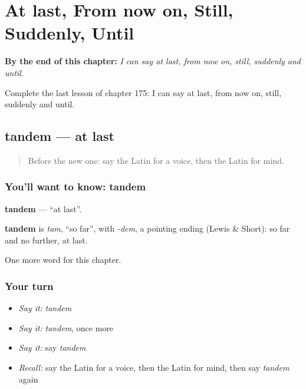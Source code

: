 
\chapter{At last, From now on, Still, Suddenly, Until}
\label{ch:la-at-last-from-now-on-still-suddenly-until}

\begin{chapteropening}
\textbf{By the end of this chapter:} \emph{I can say at last, from now on, still, suddenly and until.}

Complete the last lesson of chapter 175: I can say at last, from now on, still, suddenly and until.
\end{chapteropening}

\section[tandem]{tandem — at last}

\label{lesson:LA-C175-tandem}



\begin{quote}
Before the new one: say the Latin for a voice, then the Latin for mind.
\end{quote}

\subsection*{You'll want to know: tandem}
\textbf{tandem} — \textquotedblleft{}at last\textquotedblright{}.

\begin{cousinweb}
\textbf{tandem} is \emph{tam}, \textquotedblleft{}so far\textquotedblright{}, with \emph{-dem}, a pointing ending (Lewis \& Short): so far and no further, at last.
\end{cousinweb}

\begin{grammarlens}[title={What you've built}]
One more word for this chapter.
\end{grammarlens}

\subsection*{Your turn}
\begin{itemize}
\raggedright
  \item \emph{Say it:} \emph{tandem}
  \item \emph{Say it:} \emph{tandem}, once more
  \item \emph{Say it:} say \emph{tandem}
  \item \emph{Recall:} say the Latin for a voice, then the Latin for mind, then say \emph{tandem} again
\end{itemize}

